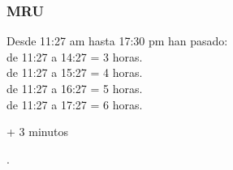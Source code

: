 \documentclass{beamer}
\begin{document}
\begin{frame}
\frametitle{MRU}
% 
 
{\huge                
\xmru
}

Desde 11:27 am hasta
17:30 pm han pasado:\\
{\tiny 
de 11:27 a 14:27 = 3 horas. \\
de 11:27 a 15:27 = 4 horas. \\
de 11:27 a 16:27 = 5 horas. \\
de 11:27 a 17:27 = 6 horas. \\
}

\begin{center}
{\huge + }
3 minutos
\end{center}

.

 
\end{frame}
\end{document}
